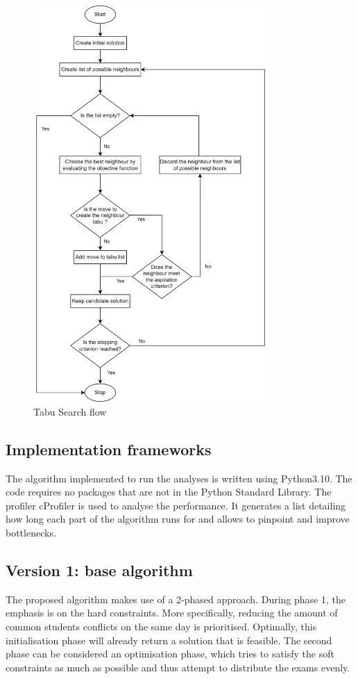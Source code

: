 \begin{figure}[h]
	\centering
	\includegraphics[width=0.8\textwidth]{images/tabu.png} 
	\caption{Tabu Search flow}
	\label{fig:tabu-chart}
\end{figure}

\subsection{Implementation frameworks}

The algorithm implemented to run the analyses is written using Python3.10. The code requires no packages that are not in the Python Standard Library. The profiler cProfiler is used to analyse the performance. It generates a list detailing how long each part of the algorithm runs for and allows to pinpoint and improve bottlenecks.

\subsection{Version 1: base algorithm}
The proposed algorithm makes use of a 2-phased approach. During phase 1, the emphasis is on the hard constraints. More specifically, reducing the amount of common students conflicts on the same day is prioritised. Optimally, this initialisation phase will already return a solution that is feasible. The second phase can be considered an optimisation phase, which tries to satisfy the soft constraints as much as possible and thus attempt to distribute the exams evenly.


